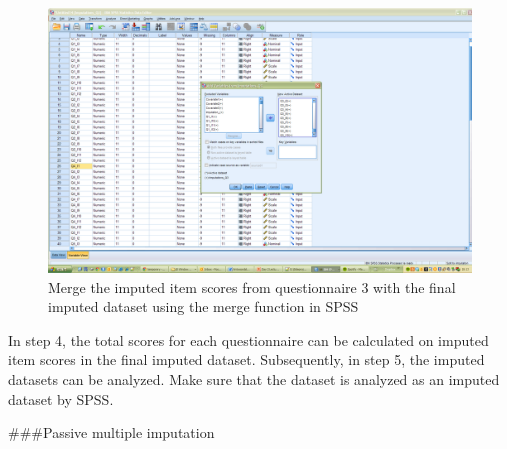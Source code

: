 \documentclass[
]{book}
\begin{document}
\begin{figure}

{\centering \includegraphics[width=0.9\linewidth]{images/fig8.9} 

}

\caption{Merge the imputed item scores from questionnaire 3 with the final imputed dataset using the merge function in SPSS}\label{fig:fig8-9}
\end{figure}

In step 4, the total scores for each questionnaire can be calculated on imputed item scores in the final imputed dataset. Subsequently, in step 5, the imputed datasets can be analyzed. Make sure that the dataset is analyzed as an imputed dataset by SPSS.

\#\#\#Passive multiple imputation
\end{document}
